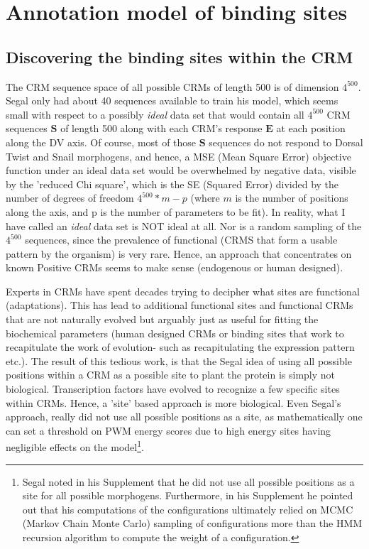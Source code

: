   
  \section{Annotation model of binding sites}
\subsection{Discovering the binding sites within the CRM}
The CRM sequence space of all possible CRMs of length 500 is of dimension $4^{500}$.  Segal only had about 40 sequences available to train his model, which seems small with respect to a possibly \emph{ideal} data set that would contain all $4^{500}$ CRM sequences $\textbf{S}$ of length 500 along with each CRM's response $\textbf{E}$ at each position along the DV axis.  Of course, most of those $\textbf{S}$ sequences do not respond to Dorsal Twist and Snail morphogens, and hence, a MSE (Mean Square Error) objective function under an ideal data set would be overwhelmed by negative data, visible by the 'reduced Chi square', which  is the SE (Squared Error) divided by the number of degrees of freedom $4^{500} * m - p$ (where $m$ is the number of positions along the axis, and p is the number of parameters to be fit).  In reality, what I have called an \emph{ideal} data set is NOT ideal at all.  Nor is a random sampling of the $4^{500}$ sequences, since the prevalence of functional (CRMS that form a usable pattern by the organism) is very rare.  Hence, an approach that concentrates on known Positive CRMs seems to make sense (endogenous or human designed).

Experts in CRMs have spent decades trying to decipher what sites are functional (adaptations).  This has lead to additional functional sites and functional CRMs that are not naturally evolved but arguably just as useful for fitting the biochemical parameters (human designed CRMs or binding sites that work to recapitulate the work of evolution- such as recapitulating the expression pattern etc.). The result of this tedious work, is that the Segal idea of using all possible positions within a CRM as a possible site to plant the protein is simply not biological.  Transcription factors have evolved to recognize a few specific sites within CRMs.  Hence, a 'site' based approach is more biological.  Even Segal's approach, really did not use all possible positions as a site, as mathematically one can set a threshold on PWM energy scores due to high energy sites having negligible effects on the model\footnote{Segal noted in his Supplement that he did not use all possible positions as a site for all possible morphogens.  Furthermore, in his Supplement he pointed out that his computations of the configurations ultimately relied on MCMC (Markov Chain Monte Carlo) sampling of configurations more than the HMM recursion algorithm to compute the weight of a configuration.}.  



